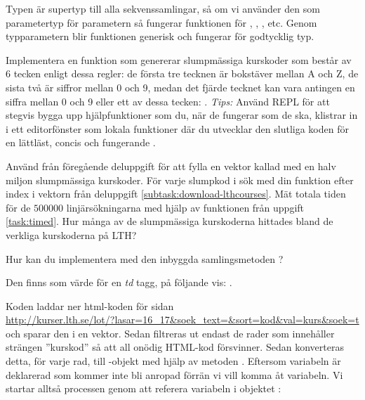 Typen  är supertyp till alla sekvenssamlingar, så om vi använder den som parametertyp för parametern  så fungerar funktionen för , , , etc. Genom typparametern  blir funktionen generisk och fungerar för godtycklig typ.



\Subtask \label{subtask:linsearch-rndCode} Implementera en funktion  som genererar slumpmässiga kurskoder som består av 6 tecken enligt dessa regler: de första tre tecknen är bokstäver mellan A och Z, de sista två är siffror mellan 0 och 9, medan det fjärde tecknet kan vara antingen en siffra mellan 0 och 9 eller ett av dessa tecken: . \emph{Tips:} Använd REPL  för att stegvis bygga upp hjälpfunktioner som du, när de fungerar som de ska, klistrar in i ett editorfönster som lokala funktioner där du utvecklar den slutliga koden för en lättläst, concis och fungerande .


\Subtask Använd  från föregående deluppgift för att fylla en vektor kallad  med en halv miljon slumpmässiga kurskoder. För varje slumpkod i  sök med din funktion  efter index i vektorn  från deluppgift \ref{subtask:download-lthcourses}. Mät totala tiden för de $500000$ linjärsökningarna med hjälp av funktionen  från uppgift \ref{task:timed}. Hur många av de slumpmässiga kurskoderna hittades bland de verkliga kurskoderna på LTH?



\Subtask\Pen Hur kan du implementera  med den inbyggda samlingsmetoden ?



\SOLUTION


\TaskSolved \what


\SubtaskSolved
Den finns som värde för en \emph{td} tagg, på följande vis: .

\SubtaskSolved
Koden laddar ner html-koden för sidan \\ \mbox{\small\url{http://kurser.lth.se/lot/?lasar=16_17&soek_text=&sort=kod&val=kurs&soek=t}} och sparar den i en vektor. Sedan filtreras ut endast de rader som innehåller strängen ”kurskod” så att all onödig HTML-kod försvinner. Sedan konverteras detta, för varje rad, till -objekt med hjälp av metoden . Eftersom variabeln  är deklarerad som  kommer inte  bli anropad förrän vi vill komma åt variabeln. Vi startar alltså processen genom att referera variabeln  i objektet :

